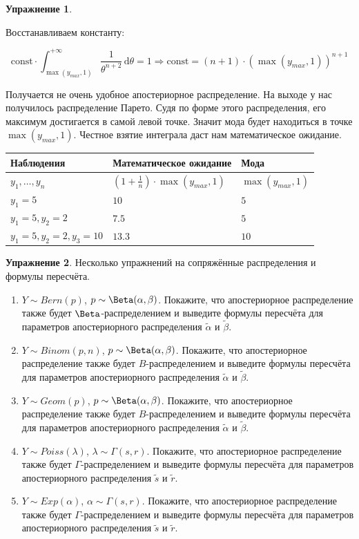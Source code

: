 \documentclass[12pt, a4paper, oneside]{extreport}
\newcommand{\const}{\mathrm{const}}        %
\newcommand{\dx}[1]{\,\mathrm{d}#1} %
\theoremstyle{plain}              %
\theoremstyle{definition}         %
\newtheorem{problem}{\color{myblue} Упражнение}
\begin{document}
\begin{problem}
\begin{sol}
Восстанавливаем константу: 

\[
\const \cdot \int_{\max(y_{max},1)}^{+\infty} \frac{1}{\theta^{n+2}} \dx{\theta} = 1  \Rightarrow  \const = (n+1)\cdot(\max(y_{max},1))^{n+1}
\]

Получается не очень удобное апостериорное распределение. На выходе у нас получилось распределение Парето. Судя по форме этого распределения, его максимум достигается в самой левой точке. Значит мода будет находиться в точке $\max(y_{max},1)$. Честное взятие интеграла даст нам математическое ожидание.

\begin{tabularx}{\textwidth}{X|X|X}
Наблюдения & Математическое ожидание & Мода \\
\hline
$y_1, \ldots, y_n$ & $(1 + \frac{1}{n}) \cdot \max(y_{max},1)$ & $\max(y_{max},1)$ \\
$y_1 = 5$ & $10$ & $5$ \\
$y_1 = 5, y_2 = 2$ & $7.5$ & $5$ \\
$y_1=5, y_2=2, y_3=10$ &  $13.3$ & $10$ 
\end{tabularx}


\end{sol}
\end{problem}


\begin{problem}
	Несколько упражнений на сопряжённые распределения и формулы пересчёта. 
	\begin{enumerate} 
		\item $Y \sim Bern(p)$, $p \sim \Beta(\alpha, \beta)$. Покажите, что апостериорное распределение также будет $\Beta$-распределением и выведите формулы пересчёта для параметров апостериорного распределения $\tilde{\alpha} $ и $\tilde \beta$.
		\item $Y \sim Binom(p,n)$,  $p \sim \Beta(\alpha, \beta)$. Покажите, что апостериорное распределение также будет $B$-распределением и выведите формулы пересчёта для параметров апостериорного распределения $\tilde{\alpha} $ и $\tilde \beta$.
		\item  $Y \sim Geom(p)$,  $p \sim \Beta(\alpha, \beta)$. Покажите, что апостериорное распределение также будет $B$-распределением и выведите формулы пересчёта для параметров апостериорного распределения $\tilde{\alpha} $ и $\tilde \beta$.
		\item  $Y \sim Poiss(\lambda)$, $\lambda \sim  \Gamma(s,r)$. Покажите, что апостериорное распределение также будет $\Gamma$-распределением и выведите формулы пересчёта для параметров апостериорного распределения $\tilde{s} $ и $\tilde r$.
		\item $Y \sim Exp(\alpha)$, $\alpha \sim \Gamma(s,r)$. Покажите, что апостериорное распределение также будет $\Gamma$-распределением и выведите формулы пересчёта для параметров апостериорного распределения $\tilde{s} $ и $\tilde r$.
	\end{enumerate}
	\begin{sol}
	\end{sol}
\end{problem}
\end{document}
